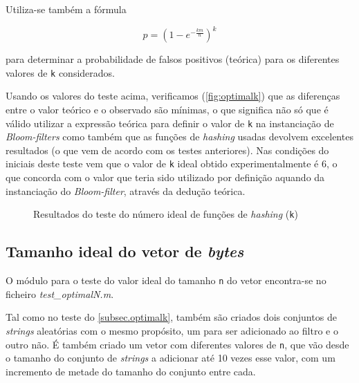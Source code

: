 \documentclass[a4paper,11pt,openright,oneside]{report}
\begin{document}
Utiliza-se também a fórmula

$$ p =  \left(1 - e^{-\frac{km}{n}}\right)^k $$

para determinar a probabilidade de falsos positivos (teórica) para os diferentes valores de \texttt{k} considerados.

Usando os valores do teste acima, verificamos (\autoref{fig:optimalk}) que as diferenças entre o valor teórico e o observado são mínimas, o que significa não só que é válido utilizar a expressão teórica para definir o valor de \texttt{k} na instanciação de \textit{Bloom-filters} como também que as funções de \textit{hashing} usadas devolvem excelentes resultados (o que vem de acordo com os testes anteriores). Nas condições do iniciais deste teste vem que o valor de \texttt{k} ideal obtido experimentalmente é 6, o que concorda com o valor que teria sido utilizado por definição aquando da instanciação do \textit{Bloom-filter}, através da dedução teórica.

\begin{figure}[ht]
\center
{}
\caption{Resultados do teste do número ideal de funções de \textit{hashing} (\texttt{k})}
\label{fig:optimalk}
\end{figure}

\subsection{Tamanho ideal do vetor de \textit{bytes}}
\label{subsec.optimaln}

O módulo para o teste do valor ideal do tamanho \texttt{n} do vetor encontra-se no ficheiro \textit{test\_optimalN.m}.

Tal como no teste do \autoref{subsec.optimalk}, também são criados dois conjuntos de \textit{strings} aleatórias com o mesmo propósito, um para ser adicionado ao filtro e o outro não. É também criado um vetor com diferentes valores de \texttt{n}, que vão desde o tamanho do conjunto de \textit{strings} a adicionar até 10 vezes esse valor, com um incremento de metade do tamanho do conjunto entre cada.
\end{document}

